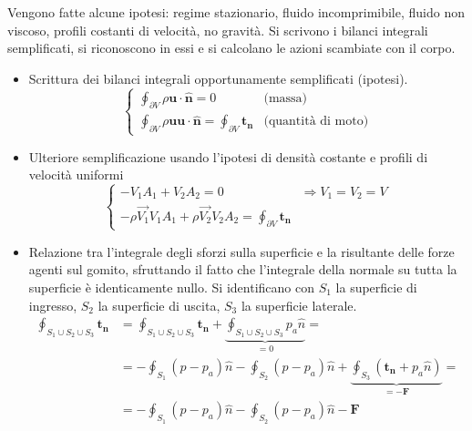 \parttwo
Vengono fatte alcune ipotesi: regime stazionario, fluido incomprimibile, fluido non viscoso, profili costanti di velocità, no gravità.
Si scrivono i bilanci integrali semplificati, si riconoscono in essi e si calcolano le azioni scambiate con il corpo.

\begin{itemize}
  \item Scrittura dei bilanci integrali opportunamente semplificati (ipotesi).
    \begin{equation}
     \begin{cases}
      \oint_{\partial V} \rho \bm{u} \cdot \hat{\bm{n}} = 0  & \text{(massa)} \\
      \oint_{\partial V} \rho \bm{u} \bm{u} \cdot \hat{\bm{n}} = \oint_{\partial V} \bm{t_n} & \text{(quantità di moto)}
     \end{cases}
    \end{equation}
  \item Ulteriore semplificazione usando l'ipotesi di densità costante e profili di velocità uniformi
    \begin{equation}
     \begin{cases}
      -V_1 A_1 + V_2 A_2 = 0 \qquad \qquad \qquad \Rightarrow  V_1 = V_2 = V \\
      - \rho \vec{V_1} V_1 A_1 + \rho \vec{V_2} V_2 A_2 = \oint_{\partial V} \bm{t_n}
     \end{cases}
    \end{equation}
  \item Relazione tra l'integrale degli sforzi sulla superficie e la risultante delle forze agenti sul gomito, sfruttando il fatto che l'integrale della normale su tutta la superficie è identicamente nullo. Si identificano con $S_1$ la superficie di ingresso, $S_2$ la superficie di uscita, $S_3$ la superficie laterale.
    \begin{equation}
     \begin{aligned}
       \displaystyle\oint_{S_1\cup S_2\cup S_3} \bm{t_n} & =  \displaystyle\oint_{S_1\cup S_2\cup S_3} \bm{t_n} + \underbrace{\displaystyle\oint_{S_1\cup S_2\cup S_3} p_a \hat{n}}_{=0} = \\
      & = -\oint_{S_1} (p-p_a) \hat{n} - \oint_{S_2} (p-p_a) \hat{n} + \underbrace{\oint_{S_3} (\bm{t_n}+p_a \hat{n})}_{=-\bm{F}} =  \\
      & = -\oint_{S_1} (p-p_a) \hat{n} - \oint_{S_2} (p-p_a) \hat{n} - \bm{F} 
     \end{aligned}
    \end{equation}

\end{itemize}
